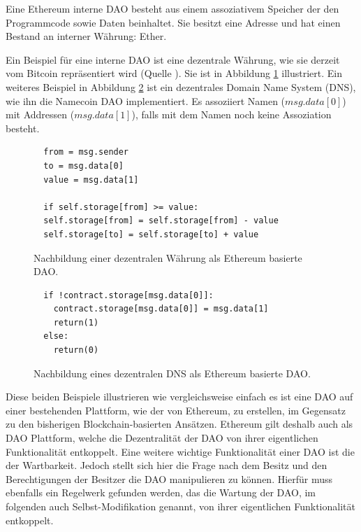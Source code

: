 \documentclass[a4paper,12pt]{report}
\begin{document}
Eine Ethereum interne DAO besteht aus einem assoziativem Speicher der den Programmcode sowie Daten beinhaltet. Sie besitzt eine Adresse und hat einen Bestand an interner Währung: Ether.

Ein Beispiel für eine interne DAO ist eine dezentrale Währung, wie sie derzeit vom Bitcoin repräsentiert wird (Quelle \cite{Butterin2014}). Sie ist in Abbildung \ref{contract1} illustriert. Ein weiteres Beispiel in Abbildung \ref{contract2} ist ein dezentrales Domain Name System (DNS), wie ihn die Namecoin DAO implementiert. Es assoziiert Namen ($msg.data[0]$) mit Addressen ($msg.data[1]$), falls mit dem Namen noch keine Assoziation besteht.



\begin{figure}[ht]
  \centering
\begin{lstlisting}
  from = msg.sender
  to = msg.data[0]
  value = msg.data[1]

  if self.storage[from] >= value:
  self.storage[from] = self.storage[from] - value
  self.storage[to] = self.storage[to] + value
\end{lstlisting}
  \caption{Nachbildung einer dezentralen Währung als Ethereum basierte DAO.}
  \label{contract1}
\end{figure}

\begin{figure}[ht]
  \centering
\begin{lstlisting}
  if !contract.storage[msg.data[0]]:
    contract.storage[msg.data[0]] = msg.data[1]
    return(1)
  else:
    return(0)
\end{lstlisting}
  \caption{Nachbildung eines dezentralen DNS als Ethereum basierte DAO.}
  \label{contract2}
\end{figure}

Diese beiden Beispiele illustrieren wie vergleichsweise einfach es ist eine DAO auf einer bestehenden Plattform, wie der von Ethereum, zu erstellen, im Gegensatz zu den bisherigen Blockchain-basierten Ansätzen. Ethereum gilt deshalb auch als DAO Plattform, welche die Dezentralität der DAO von ihrer eigentlichen Funktionalität entkoppelt. Eine weitere wichtige Funktionalität einer DAO ist die der Wartbarkeit. Jedoch stellt sich hier die Frage nach dem Besitz und den Berechtigungen der Besitzer die DAO manipulieren zu können. Hierfür muss ebenfalls ein Regelwerk gefunden werden, das die Wartung der DAO, im folgenden auch Selbst-Modifikation genannt, von ihrer eigentlichen Funktionalität entkoppelt. 
\end{document}
